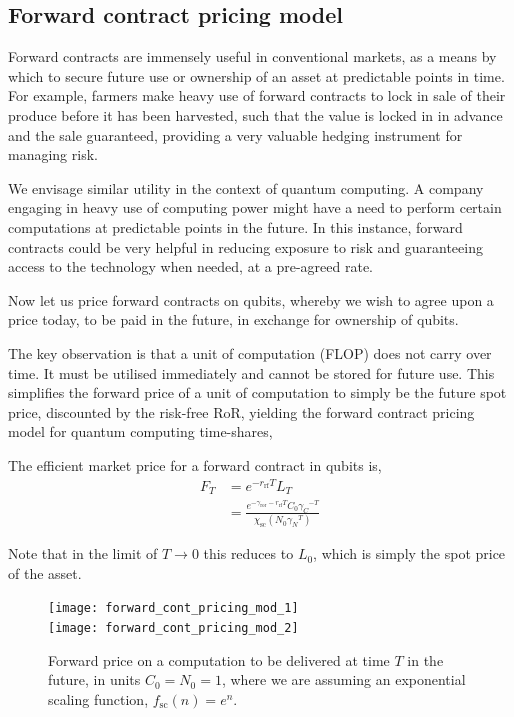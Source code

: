 %
%

\subsection{Forward contract pricing model}\label{sec:for_contr}

Forward contracts are immensely useful in conventional markets, as a means by which to secure future use or ownership of an asset at predictable points in time. For example, farmers make heavy use of forward contracts to lock in sale of their produce before it has been harvested, such that the value is locked in in advance and the sale guaranteed, providing a very valuable hedging instrument for managing risk.

We envisage similar utility in the context of quantum computing. A company engaging in heavy use of computing power might have a need to perform certain computations at predictable points in the future. In this instance, forward contracts could be very helpful in reducing exposure to risk and guaranteeing access to the technology when needed, at a pre-agreed rate.

Now let us price forward contracts on qubits, whereby we wish to agree upon a price today, to be paid in the future, in exchange for ownership of qubits.

The key observation is that a unit of computation (FLOP) does not carry over time. It must be utilised immediately and cannot be stored for future use. This simplifies the forward price of a unit of computation to simply be the future spot price, discounted by the risk-free RoR, yielding the forward contract pricing model for quantum computing time-shares,
\begin{definition} \label{def:forward_cont}
The efficient market price for a forward contract in qubits is,
\begin{align}
F_T &= e^{-r_\text{rf}T} L_T\nonumber\\
&=\frac{e^{-\gamma_\text{ror}-r_\text{rf}T} C_0{\gamma_C}^{-T}}{\chi_\text{sc}(N_0 {\gamma_N}^T)}
\end{align}
\end{definition}

Note that in the limit of \mbox{$T\to 0$} this reduces to $L_0$, which is simply the spot price of the asset.

\begin{figure}[!htb]
\texttt{[image: forward\_cont\_pricing\_mod\_1]}\\
\texttt{[image: forward\_cont\_pricing\_mod\_2]}
\caption{Forward price on a computation to be delivered at time $T$ in the future, in units \mbox{$C_0=N_0=1$}, where we are assuming an exponential scaling function, \mbox{$f_\text{sc}(n)=e^n$}.}\label{fig:forward_cont_pricing_mod}
\end{figure}

